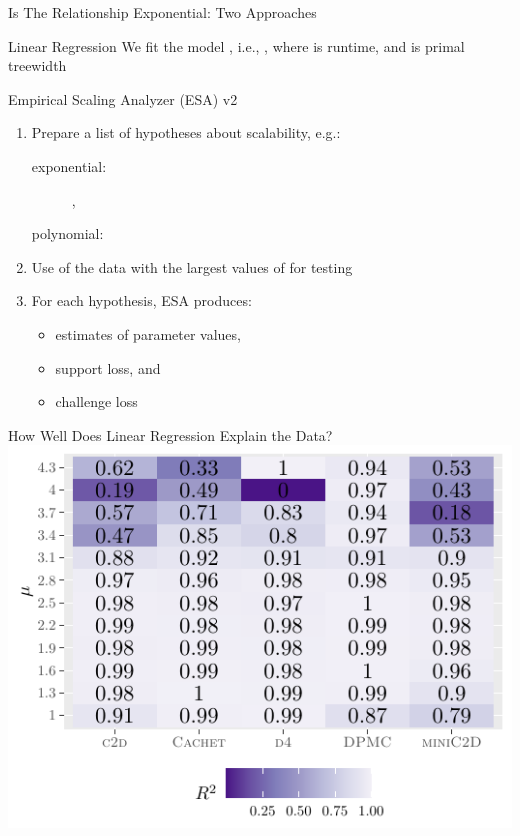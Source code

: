 \documentclass{beamer}
\begin{document}
\begin{frame}{Is The Relationship Exponential: Two Approaches}
  \begin{block}{Linear Regression}
    We fit the model , i.e.,
    , where  is
    \alert{runtime}, and  is \alert{primal treewidth}
    \end{block}
    \begin{block}{Empirical Scaling Analyzer (ESA)
        v2~\parencite{DBLP:conf/gecco/PushakH20}}
    \begin{enumerate}
      \item Prepare a list of hypotheses about scalability, e.g.:
      \begin{description}
        \item[exponential:] ,
        \item[polynomial:] 
      \end{description}
      \item Use  of the data with the largest
            values of  for testing
      \item For each hypothesis, ESA produces:
      \begin{itemize}
        \item estimates of parameter values,
        \item support loss, and
        \item challenge loss
      \end{itemize}
    \end{enumerate}
  \end{block}
\end{frame}

\begin{frame}{How Well Does Linear Regression Explain the Data?}
  \centering
  \includegraphics{r2.pdf}
\end{frame}
\end{document}
